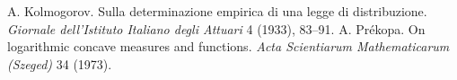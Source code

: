  A. Kolmogorov. Sulla determinazione empirica di una legge di distribuzione. \emph{Giornale dell'Istituto Italiano degli Attuari} 4 (1933), 83--91.
 A. Pr\'ekopa. On logarithmic concave measures and functions. \emph{Acta Scientiarum Mathematicarum (Szeged)} 34 (1973).
